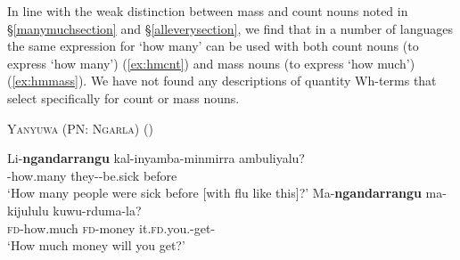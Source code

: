 \documentclass[12pt,egregdoesnotlikesansseriftitles]{scrartcl}
\begin{document}
In line with the weak distinction between mass and count nouns noted in \S\ref{manymuchsection} and \S\ref{alleverysection}, we find that in a number of languages the same expression for `how many' can be used with both count nouns (to express `how many')  (\ref{ex:hmcnt}) and  mass nouns (to express `how much')  (\ref{ex:hmmass}). We have not found any descriptions of quantity Wh-terms that select specifically for count or mass nouns. 
\begin{exe}
  \ex \textsc{Yanyuwa (PN: Ngarla)} \hfill (\citealt[27]{kc96})
  \begin{xlist}
    \ex \gll Li-\textbf{ngandarrangu} kal-inyamba-minmirra ambuliyalu?\\
    \Pl-how.many   they-\Refl-be.sick  before\\
    \glt `How many people were sick before [with flu like this]?' \label{ex:hmcnt}
    \ex \gll Ma-\textbf{ngandarrangu} ma-kijululu kuwu-rduma-la?\\
    \textsc{fd}-how.much  \textsc{fd}-money it.\textsc{fd}.you.\Sg-get-\Fut\\
    \glt `How much money will you get?' \label{ex:hmmass}
  \end{xlist}
  
  
  

\end{exe}
\end{document}
